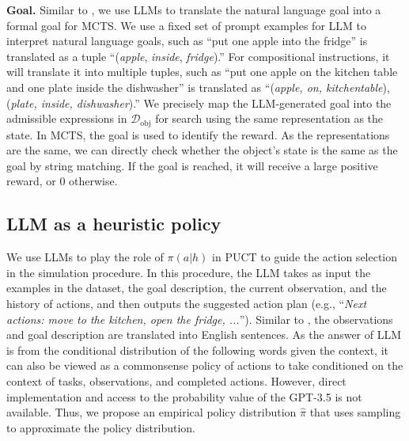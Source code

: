 \textbf{Goal.}
Similar to \cite{xie2023translating}, we use LLMs to translate the natural language goal into a formal goal for MCTS. 
We use a fixed set of prompt examples for LLM to interpret natural language goals, such as ``put one apple into the fridge'' is translated as a tuple ``(\textit{apple}, \textit{inside}, \textit{fridge}).'' For compositional instructions, it will translate it into multiple tuples, such as ``put one apple on the kitchen table and one plate inside the dishwasher'' is translated as ``(\textit{apple, on, kitchentable}), (\textit{plate, inside, dishwasher}).'' We precisely map the LLM-generated goal into the admissible expressions in $\mathcal{D}_\mathrm{obj}$ for search using the same representation as the state. In MCTS, the goal is used to identify the reward. As the representations are the same, we can directly check whether the object's state is the same as the goal by string matching. If the goal is reached, it will receive a large positive reward, or 0 otherwise. 

\subsection{LLM as a heuristic policy}

We use LLMs to play the role of $\pi(a|h)$ in PUCT to guide the action selection in the simulation procedure. In this procedure, the LLM takes as input the examples in the dataset, the goal description, the current observation, and the history of actions, and then outputs the suggested action plan (e.g., ``\textit{Next actions: move to the kitchen, open the fridge, ...}''). Similar to \cite{li2022pre}, the observations and goal description are translated into English sentences. As the answer of LLM is from the conditional distribution of the following words given the context, it can also be viewed as a commonsense policy of actions to take conditioned on the context of tasks, observations, and completed actions. However, direct implementation and access to the probability value of the GPT-3.5 is not available. Thus, we propose an empirical policy distribution $\hat{\pi}$ that uses sampling to approximate the policy distribution. 

